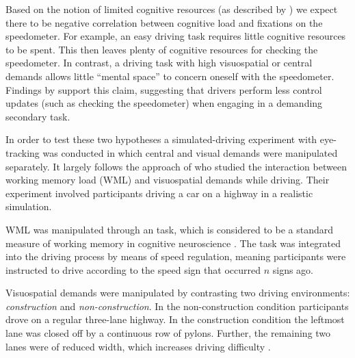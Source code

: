 Based on the notion of limited cognitive resources (as described by \citet{DeWaard1996}) we expect there to be negative correlation between cognitive load and fixations on the speedometer.
For example, an easy driving task requires little cognitive resources to be spent.
This then leaves plenty of cognitive resources for checking the speedometer.
In contrast, a driving task with high visuospatial or central demands allows little ``mental space'' to concern oneself with the speedometer.
Findings by \citet{Salvucci2011} support this claim, suggesting that drivers perform less control updates (such as checking the speedometer) when engaging in a demanding secondary task.

In order to test these two hypotheses a simulated-driving experiment with eye-tracking was conducted in which central and visual demands were manipulated separately.
It largely follows the approach of \citet{Scheunemann2019} who studied the interaction between working memory load (WML) and visuospatial demands while driving.
Their experiment involved participants driving a car on a highway in a realistic simulation. 

WML was manipulated through an \nback task, which is considered to be a standard measure of working memory in cognitive neuroscience \citep{Kane2007}.
The task was integrated into the driving process by means of speed regulation, meaning participants were instructed to drive according to the speed sign that occurred \(n\) signs ago.

Visuospatial demands were manipulated by contrasting two driving environments: \textit{construction} and \textit{non-construction}.
In the non-construction condition participants drove on a regular three-lane highway.
In the construction condition the leftmost lane was closed off by a continuous row of pylons.
Further, the remaining two lanes were of reduced width, which increases driving difficulty \citep{Liu2016}.
